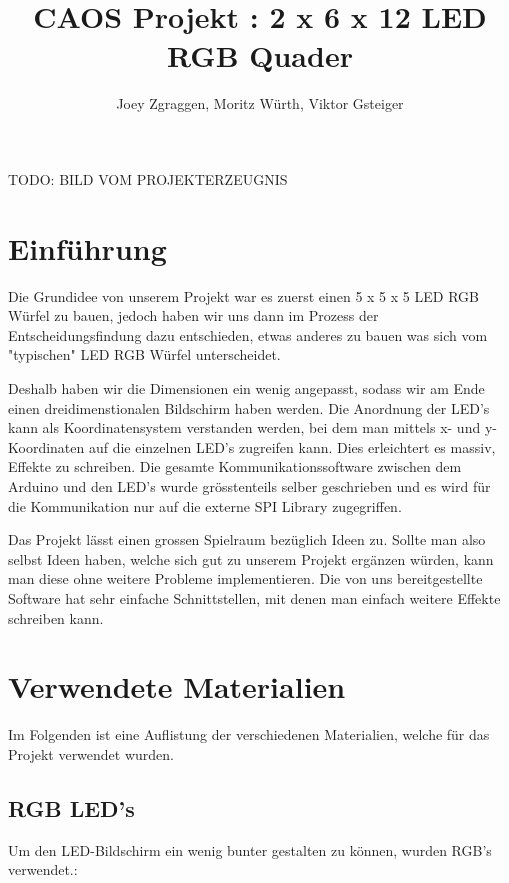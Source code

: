 \documentclass[12pt,a4paper]{article}
\title{\textbf{CAOS Projekt : 2 x 6 x 12 LED RGB Quader}}
\author{Joey Zgraggen, Moritz Würth, Viktor Gsteiger}
\begin{document}
\renewcommand\contentsname{Inhaltsverzeichnis}
\begin{titlepage}
\maketitle
TODO: BILD VOM PROJEKTERZEUGNIS
\end{titlepage}
\tableofcontents
\newpage

\section{Einführung}

Die Grundidee von unserem Projekt war es zuerst einen 5 x 5 x 5 LED RGB Würfel zu bauen, jedoch haben wir uns dann im Prozess der Entscheidungsfindung
dazu entschieden, etwas anderes zu bauen was sich vom "typischen" LED RGB Würfel unterscheidet.

Deshalb haben wir die Dimensionen ein wenig angepasst, sodass wir am Ende einen dreidimenstionalen Bildschirm haben werden. Die Anordnung der LED's kann als Koordinatensystem verstanden werden, bei dem man mittels x- und y-Koordinaten auf die einzelnen LED's zugreifen kann. Dies erleichtert es massiv, Effekte zu schreiben. Die gesamte Kommunikationssoftware zwischen dem Arduino und den LED's wurde grösstenteils selber geschrieben und es wird für die Kommunikation nur auf die externe SPI Library zugegriffen\cite{SPI}.

Das Projekt lässt einen grossen Spielraum bezüglich Ideen zu. Sollte man also selbst Ideen haben, welche sich gut zu unserem Projekt ergänzen würden, kann man diese ohne weitere Probleme implementieren. Die von uns bereitgestellte Software hat sehr einfache Schnittstellen, mit denen man einfach weitere Effekte schreiben kann.


\section{Verwendete Materialien}

Im Folgenden ist eine Auflistung der verschiedenen Materialien, welche für das Projekt verwendet wurden.

\subsection{RGB LED's}

Um den LED-Bildschirm ein wenig bunter gestalten zu können, wurden RGB's verwendet.:
\end{document}
